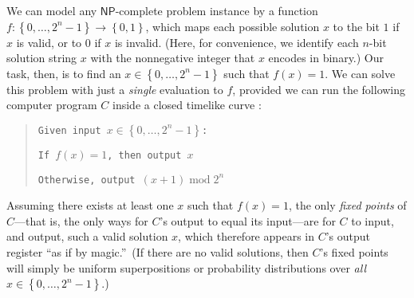 \documentclass[12pt,onecolumn]{article}%
\begin{document}
We can model any $\mathsf{NP}$-complete problem instance by a function
$f:\left\{  0,\ldots,2^{n}-1\right\}  \rightarrow\left\{  0,1\right\}  $,
which maps each possible solution $x$ to the bit $1$ if $x$ is valid, or to
$0$ if $x$ is invalid. (Here, for convenience, we identify each $n$-bit
solution string $x$ with the nonnegative integer that $x$ encodes in
binary.) Our task, then, is to find an $x\in\left\{  0,\ldots,2^{n}%
-1\right\}  $ such that $f\left(  x\right)  =1$. We can solve this problem
with just a \textit{single} evaluation to $f$, provided we can run the
following computer program $C$ inside a closed timelike curve
\cite{brun,aar:np,awat}:

\begin{quotation}
\texttt{Given input }$x\in\left\{  0,\ldots,2^{n}-1\right\}  $\texttt{:}

\texttt{If }$f\left(  x\right)  =1$\texttt{, then output }$x$

\texttt{Otherwise, output }$\left(  x+1\right)  \operatorname{mod}2^{n}$
\end{quotation}

Assuming there exists at least one $x$ such that $f\left(  x\right)  =1$, the
only \textit{fixed points} of $C$---that is, the only ways for $C$'s output to
equal its input---are for $C$ to input, and output, such a valid solution $x$,
which therefore appears in $C$'s output register \textquotedblleft as if by
magic.\textquotedblright\  (If there are no valid solutions, then $C$'s
fixed points will simply be uniform superpositions or probability
distributions over \textit{all} $x\in\left\{  0,\ldots,2^{n}-1\right\}  $.)
\end{document}

